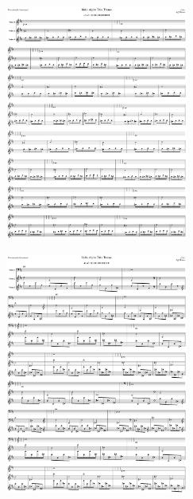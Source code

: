 \begin{figure}[H]                                             
{                                                             
  \setlength{\tabcolsep}{3.0pt}                               
  \setlength\cmidrulewidth{\heavyrulewidth} %
    \begin{subfigure}{0.5\textwidth}                            
  \includegraphics[width=6cm]{music/title_no_43_page_1001.png}%
    \end{subfigure}                                             
  \begin{subfigure}{0.5\textwidth}                            
  \includegraphics[width=6cm]{music/title_no_44_page_1001.png}%
    \end{subfigure}                                             
}                                                             
\end{figure}                                                  


